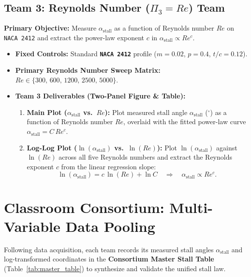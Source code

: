 \documentclass[11pt,a4paper]{article}
\begin{document}
\subsection{Team 3: Reynolds Number (\texorpdfstring{$\Pi_3 = Re$}{Pi3 = Re}) Team}
\textbf{Primary Objective:} Measure $\alpha_{\text{stall}}$ as a function of Reynolds number $Re$ on \texttt{NACA 2412} and extract the power-law exponent $c$ in $\alpha_{\text{stall}} \propto Re^c$.
\begin{itemize}[itemsep=2pt]
    \item \textbf{Fixed Controls:} Standard \textbf{\texttt{NACA 2412}} profile ($m = 0.02$, $p = 0.4$, $t/c = 0.12$).
    \item \textbf{Primary Reynolds Number Sweep Matrix:} $Re \in \{300,\, 600,\, 1200,\, 2500,\, 5000\}$.
    \item \textbf{Team 3 Deliverables (Two-Panel Figure \& Table):}
    \begin{enumerate}
        \item \textbf{Main Plot ($\alpha_{\text{stall}}$ vs.\ $Re$):} Plot measured stall angle $\alpha_{\text{stall}}$ ($^\circ$) as a function of Reynolds number $Re$, overlaid with the fitted power-law curve $\alpha_{\text{stall}} = C\,Re^c$.
        \item \textbf{Log-Log Plot ($\ln(\alpha_{\text{stall}})$ vs.\ $\ln(Re)$):} Plot $\ln(\alpha_{\text{stall}})$ against $\ln(Re)$ across all five Reynolds numbers and extract the Reynolds exponent $c$ from the linear regression slope:
        \begin{equation}
        \ln(\alpha_{\text{stall}}) = c\,\ln(Re) + \ln C \quad \Longrightarrow \quad \alpha_{\text{stall}} \propto Re^c.
        \end{equation}
    \end{enumerate}
\end{itemize}

\section{Classroom Consortium: Multi-Variable Data Pooling}

Following data acquisition, each team records its measured stall angles $\alpha_{\text{stall}}$ and log-transformed coordinates in the \textbf{Consortium Master Stall Table} (Table~\ref{tab:master_table}) to synthesize and validate the unified stall law.
\end{document}
